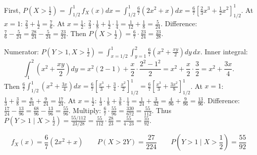 \begin{enumerate}
	      First, \(P(X>\frac12) = \int_{1/2}^1 f_X(x)dx = \int_{1/2}^1 \frac{6}{7}(2x^2+x)dx = \frac{6}{7}\left[ \frac{2}{3}x^3 + \frac{1}{2}x^2 \right]_{1/2}^1\).
	      At \(x=1\): \(\frac{2}{3}+\frac12 = \frac{7}{6}\). At \(x=\frac12\): \(\frac{2}{3}\cdot\frac18 + \frac12\cdot\frac14 = \frac{1}{12}+\frac18 = \frac{5}{24}\). Difference: \(\frac{7}{6}-\frac{5}{24} = \frac{28}{24}-\frac{5}{24}=\frac{23}{24}\). Then \(P(X>\frac12)=\frac{6}{7}\cdot\frac{23}{24}=\frac{23}{28}\).

	      Numerator: \(P(Y>1,X>\frac12) = \int_{x=1/2}^1 \int_{y=1}^2 \frac{6}{7}\left(x^2+\frac{xy}{2}\right) dy\,dx\).
	      Inner integral:
	      \[
		      \int_1^2 \left(x^2+\frac{xy}{2}\right) dy = x^2(2-1) + \frac{x}{2}\cdot\frac{2^2-1^2}{2} = x^2 + \frac{x}{2}\cdot\frac{3}{2} = x^2 + \frac{3x}{4}.
	      \]
	      Then \(\frac{6}{7}\int_{1/2}^1 \left(x^2+\frac{3x}{4}\right)dx = \frac{6}{7}\left[ \frac{x^3}{3} + \frac{3}{4}\cdot\frac{x^2}{2} \right]_{1/2}^1 = \frac{6}{7}\left[ \frac{x^3}{3} + \frac{3x^2}{8} \right]_{1/2}^1\).
	      At \(x=1\): \(\frac13+\frac38 = \frac{8}{24}+\frac{9}{24}=\frac{17}{24}\). At \(x=\frac12\): \(\frac{1}{3}\cdot\frac18 + \frac{3}{8}\cdot\frac14 = \frac{1}{24}+\frac{3}{32} = \frac{4}{96}+\frac{9}{96}=\frac{13}{96}\). Difference: \(\frac{17}{24}-\frac{13}{96} = \frac{68}{96}-\frac{13}{96}=\frac{55}{96}\). Multiply: \(\frac{6}{7}\cdot\frac{55}{96} = \frac{330}{672}=\frac{55}{112}\).
	      Thus \(P(Y>1\mid X>\frac12) = \frac{55/112}{23/28} = \frac{55}{112}\cdot\frac{28}{23} = \frac{55}{4\cdot23} = \frac{55}{92}\).

	      \[
		      \boxed{f_X(x)=\frac{6}{7}(2x^2+x)}\qquad
		      \boxed{P(X>2Y)=\frac{27}{224}}\qquad
		      \boxed{P(Y>1\mid X>\frac12)=\frac{55}{92}}
	      \]
\end{enumerate}
